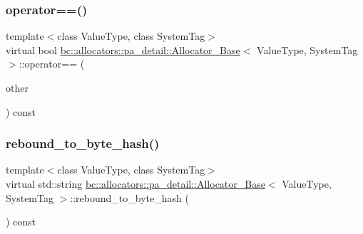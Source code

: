 \mbox{\label{structbc_1_1allocators_1_1pa__detail_1_1Allocator__Base_a044ccf83e8abc449aeba1b6c7cc7355d}} 
\subsubsection{\texorpdfstring{operator==()}{operator==()}}
{\footnotesize\ttfamily template$<$class Value\+Type, class System\+Tag$>$ \\
virtual bool \hyperlink{structbc_1_1allocators_1_1pa__detail_1_1Allocator__Base}{bc\+::allocators\+::pa\+\_\+detail\+::\+Allocator\+\_\+\+Base}$<$ Value\+Type, System\+Tag $>$\+::operator== (\begin{DoxyParamCaption}\item[{const \hyperlink{structbc_1_1allocators_1_1pa__detail_1_1Allocator__Base}{Allocator\+\_\+\+Base}$<$ Value\+Type, System\+Tag $>$ \&}]{other }\end{DoxyParamCaption}) const\hspace{0.3cm}{\ttfamily [pure virtual]}}

\mbox{\label{structbc_1_1allocators_1_1pa__detail_1_1Allocator__Base_a2a90a282042dc49c3c43306b2766ba83}} 
\subsubsection{\texorpdfstring{rebound\+\_\+to\+\_\+byte\+\_\+hash()}{rebound\_to\_byte\_hash()}}
{\footnotesize\ttfamily template$<$class Value\+Type, class System\+Tag$>$ \\
virtual std\+::string \hyperlink{structbc_1_1allocators_1_1pa__detail_1_1Allocator__Base}{bc\+::allocators\+::pa\+\_\+detail\+::\+Allocator\+\_\+\+Base}$<$ Value\+Type, System\+Tag $>$\+::rebound\+\_\+to\+\_\+byte\+\_\+hash (\begin{DoxyParamCaption}{ }\end{DoxyParamCaption}) const\hspace{0.3cm}{\ttfamily [pure virtual]}}



